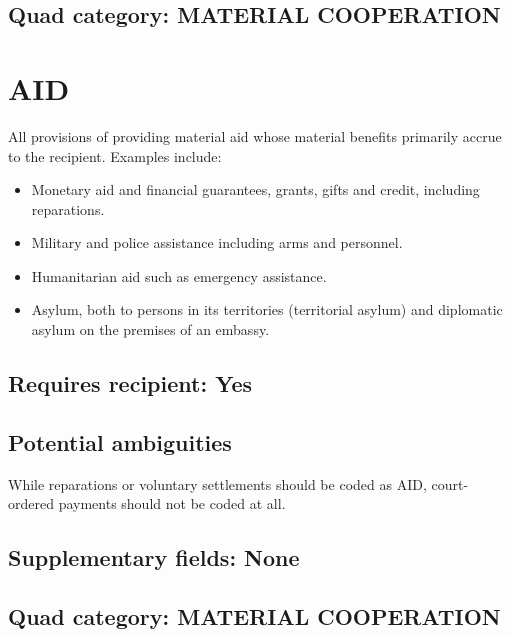 \documentclass[11pt]{report}
\newcommand{\plcat}[1]{\textsf{#1}}
\begin{document}
\subsection{Quad category: MATERIAL COOPERATION}


\newpage

\section{AID}

All provisions of providing material aid whose material benefits primarily accrue to the recipient. Examples include: 

\begin{itemize}

\item Monetary aid and financial guarantees, grants, gifts and credit, including reparations.

\item Military and police assistance including arms and personnel.

\item Humanitarian aid such as emergency assistance.

\item Asylum, both to persons in its territories (territorial asylum) and diplomatic asylum on the premises of an embassy.

\end{itemize}

\subsection{Requires recipient: Yes}

\subsection{Potential ambiguities}

While reparations or voluntary settlements should be coded as \plcat{AID}, court-ordered payments should not be coded at all.

\subsection{Supplementary fields: None}

\subsection{Quad category: MATERIAL COOPERATION}
\end{document}
